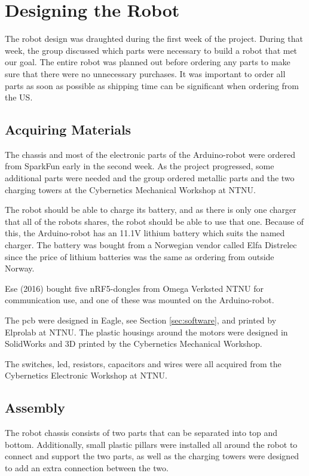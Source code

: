 \section{Designing the Robot}
\label{sec:robotdesign}
The robot design was draughted during the first week of the project. During that week, the group discussed which parts were necessary to build a robot that met our goal. The entire robot was planned out before ordering any parts to make sure that there were no unnecessary purchases. It was important to order all parts as soon as possible as shipping time can be significant when ordering from the US.

\subsection{Acquiring Materials}
The chassis and most of the electronic parts of the Arduino-robot were ordered from SparkFun \cite{sparkfun} early in the second week. As the project progressed, some additional parts were needed and the group ordered metallic parts and the two charging towers at the Cybernetics Mechanical Workshop at NTNU.

The robot should be able to charge its battery, and as there is only one charger that all of the robots shares, the robot should be able to use that one. Because of this, the Arduino-robot has an 11.1V lithium battery which suits the named charger. The battery was bought from a Norwegian vendor called Elfa Distrelec\cite{elfa} since the price of lithium batteries was the same as ordering from outside Norway.

Ese (2016) bought five nRF5-dongles from Omega Verksted NTNU  for communication use, and one of these was mounted on the Arduino-robot.

The \acrshort{pcb} were designed in Eagle, see Section \ref{sec:software}, and printed by Elprolab\cite{elprolab} at NTNU. The plastic housings around the motors were designed in SolidWorks and 3D printed by the Cybernetics Mechanical Workshop.

The switches, \acrfull{led}, resistors, capacitors and wires were all acquired from the Cybernetics Electronic Workshop at NTNU.


\subsection{Assembly}
The robot chassis consists of two parts that can be separated into top and bottom. Additionally, small plastic pillars were installed all around the robot to connect and support the two parts, as well as the charging towers were designed to add an extra connection between the two.


